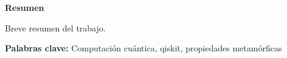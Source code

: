 \newpage

\thispagestyle{empty}

\begin{center}

{\bf \Huge Resumen}

  \end{center}
\vspace{1cm}

Breve resumen del trabajo.

\vspace{1cm}



\textbf{Palabras clave:} Computación cuántica, qiskit, propiedades metamórficas
   
   
   